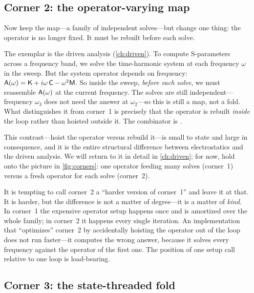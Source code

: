 \subsection{Corner 2: the operator-varying map}

Now keep the map---a family of independent solves---but change one thing: the
operator is no longer fixed. It must be rebuilt before each solve.

The exemplar is the driven analysis (\cref{ch:driven}). To compute S-parameters
across a frequency band, we solve the time-harmonic system at each frequency
$\omega$ in the sweep. But the system operator depends on frequency:
$\mathsf{A}(\omega) = \mathsf{K} + i\omega\,\mathsf{C} - \omega^2\mathsf{M}$. So inside the sweep,
\emph{before each solve}, we must reassemble $\mathsf{A}(\omega)$ at the current
frequency. The solves are still independent---frequency $\omega_3$ does not need
the answer at $\omega_2$---so this is still a map, not a fold. What distinguishes
it from corner~1 is precisely that the operator is rebuilt \emph{inside} the
loop rather than hoisted outside it. The combinator is .

This contrast---hoist the operator versus rebuild it---is small to state and
large in consequence, and it is the entire structural difference between
electrostatics and the driven analysis. We will return to it in detail in
\cref{ch:driven}; for now, hold onto the picture in \cref{fig:corners}: one
operator feeding many solves (corner~1) versus a fresh operator for each solve
(corner~2).

\begin{pitfall}
It is tempting to call corner~2 a ``harder version of corner~1'' and leave it
at that. It is harder, but the difference is not a matter of degree---it is a
matter of \emph{kind}. In corner~1 the expensive operator setup happens once and
is amortized over the whole family; in corner~2 it happens every single
iteration. An implementation that ``optimizes'' corner~2 by accidentally
hoisting the operator out of the loop does not run faster---it computes the
wrong answer, because it solves every frequency against the operator of the
first one. The position of one setup call relative to one loop is load-bearing.
\end{pitfall}

\subsection{Corner 3: the state-threaded fold}


